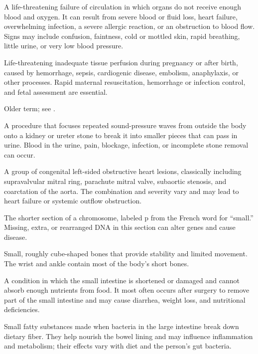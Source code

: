  A life-threatening failure of circulation in which organs do not receive enough blood and oxygen. It can result from severe blood or fluid loss, heart failure, overwhelming infection, a severe allergic reaction, or an obstruction to blood flow. Signs may include confusion, faintness, cold or mottled skin, rapid breathing, little urine, or very low blood pressure.

 Life-threatening inadequate tissue perfusion during pregnancy or after birth, caused by hemorrhage, sepsis, cardiogenic disease, embolism, anaphylaxis, or other processes. Rapid maternal resuscitation, hemorrhage or infection control, and fetal assessment are essential.

 Older term; see .

 A procedure that focuses repeated sound-pressure waves from outside the body onto a kidney or ureter stone to break it into smaller pieces that can pass in urine. Blood in the urine, pain, blockage, infection, or incomplete stone removal can occur.

 A group of congenital left-sided obstructive heart lesions, classically including
supravalvular mitral ring, parachute mitral valve, subaortic stenosis, and coarctation
of the aorta. The combination and severity vary and may lead to heart failure or
systemic outflow obstruction.

 The shorter section of a chromosome, labeled p from the French word for “small.” Missing, extra, or rearranged DNA in this section can alter genes and cause disease.

 Small, roughly cube-shaped bones that provide stability and limited movement. The wrist and ankle contain most of the body's short bones.

 A condition in which the small intestine is shortened or damaged and cannot absorb enough nutrients from food. It most often occurs after surgery to remove part of the small intestine and may cause diarrhea, weight loss, and nutritional deficiencies.

 Small fatty substances made when bacteria in the large intestine break down dietary fiber. They help nourish the bowel lining and may influence inflammation and metabolism; their effects vary with diet and the person’s gut bacteria.

